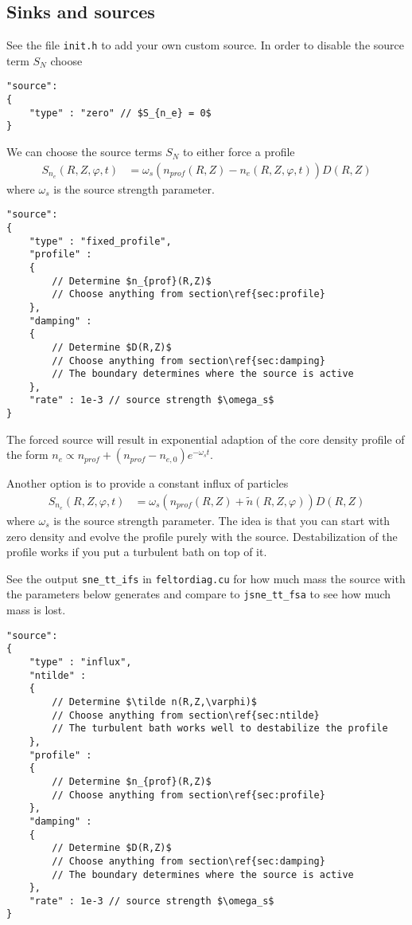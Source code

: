 \subsection{Sinks and sources} \label{sec:sources}
    See the file {\tt init.h} to add your own custom source.
In order to disable the source term $S_N$ choose
\begin{verbatim}
"source":
{
    "type" : "zero" // $S_{n_e} = 0$
}
\end{verbatim}
\noindent We can choose the source terms $S_N$ to either force a profile
\begin{align} \label{eq:electron_source}
  S_{n_e}(R,Z,\varphi, t) &= \omega_s (n_{prof}(R,Z) - n_e(R,Z,\varphi, t))D(R,Z)
\end{align}
where $\omega_s$ is the source strength parameter.
\begin{verbatim}
"source":
{
    "type" : "fixed_profile",
    "profile" :
    {
        // Determine $n_{prof}(R,Z)$
        // Choose anything from section\ref{sec:profile}
    },
    "damping" :
    {
        // Determine $D(R,Z)$
        // Choose anything from section\ref{sec:damping}
        // The boundary determines where the source is active
    },
    "rate" : 1e-3 // source strength $\omega_s$
}
\end{verbatim}
The forced source will result in exponential adaption of the core
density profile of the form $n_e \propto n_{prof}+(n_{prof}-n_{e,0})e^{-\omega_st}$.

Another option is to provide a constant influx of particles
\begin{align}
  S_{n_e}(R,Z,\varphi, t) &= \omega_s (n_{prof}(R,Z) + \tilde n(R,Z,\varphi))D(R,Z)
\end{align}
where $\omega_s$ is the source strength parameter.
The idea is that you can start with zero density and evolve the profile purely
with the source. Destabilization of the profile works if you put a turbulent
bath on top of it.
\begin{tcolorbox}[title=Note]
    See the output \texttt{sne_tt_ifs} in \texttt{feltordiag.cu} for how much mass
the source with the parameters below generates and compare to
\texttt{jsne_tt_fsa} to see how much mass is lost.
\end{tcolorbox}
\begin{verbatim}
"source":
{
    "type" : "influx",
    "ntilde" :
    {
        // Determine $\tilde n(R,Z,\varphi)$
        // Choose anything from section\ref{sec:ntilde}
        // The turbulent bath works well to destabilize the profile
    },
    "profile" :
    {
        // Determine $n_{prof}(R,Z)$
        // Choose anything from section\ref{sec:profile}
    },
    "damping" :
    {
        // Determine $D(R,Z)$
        // Choose anything from section\ref{sec:damping}
        // The boundary determines where the source is active
    },
    "rate" : 1e-3 // source strength $\omega_s$
}
\end{verbatim}

